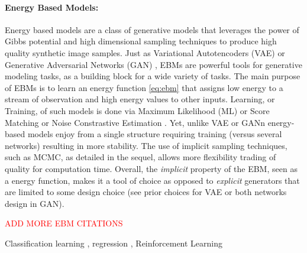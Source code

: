 \documentclass[10pt,twocolumn,letterpaper]{article}
\begin{document}
\paragraph{Energy Based Models: }
Energy based models \cite{lecun2006tutorial,ngiam2011learning} are a class of generative models that leverages the power of Gibbs potential and high dimensional sampling techniques to produce high quality synthetic image samples.
Just as Variational Autotencoders (VAE) \cite{kingma2013auto} or Generative Adversarial Networks (GAN) \cite{goodfellow2014generative}, EBMs are powerful tools for generative modeling tasks, as a building block for a wide variety of tasks. 
The main purpose of EBMs is to learn an energy function \eqref{eq:ebm} that assigns low energy to a stream of observation and high energy values to other inputs.
Learning, or Training, of such models is done via Maximum Likelihood (ML) \cite{du2019implicit} or Score Matching \cite{song2020score} or Noise Constrastive Estimation \cite{gao2020flow}.
Yet, unlike VAE or GANn energy-based models enjoy from a single structure requiring training (versus several networks) resulting in more stability.
The use of implicit sampling techniques, such as MCMC, as detailed in the sequel, allows more flexibility trading of quality for computation time.
Overall, the \emph{implicit} property of the EBM, seen as a energy function, makes it a tool of choice as opposed to \emph{explicit} generators that are limited to some design choice (see prior choices for VAE or both networks design in GAN).

\textcolor{red}{ADD MORE EBM CITATIONS}

Classification learning \cite{grathwohl2020your}, regression \cite{gustafsson2020energy}, Reinforcement Learning \cite{haarnoja2018soft}
\end{document}
